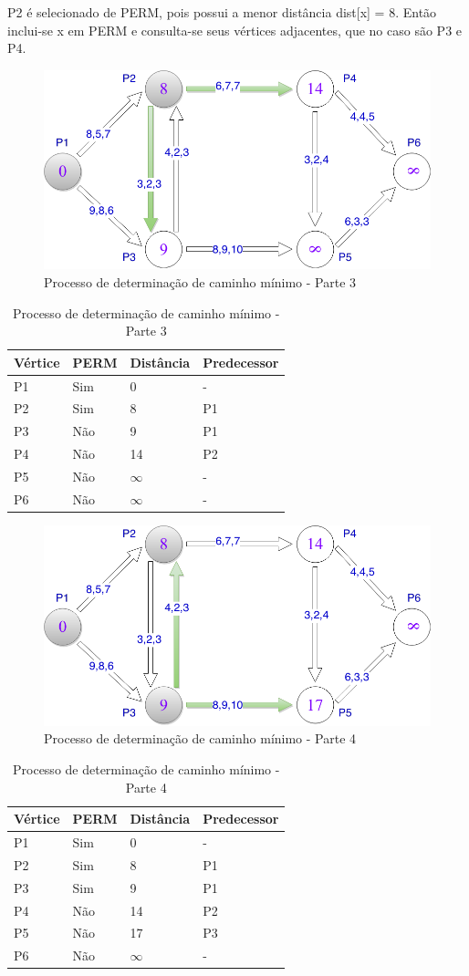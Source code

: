 P2 é selecionado de PERM, pois possui a menor distância dist[x] = 8. Então inclui-se x em PERM e consulta-se
seus vértices adjacentes, que no caso são P3 e P4.
\FloatBarrier
\begin{figure}[htbp]
\centering
 \includegraphics[width=.50\textwidth]{chapters/fig/leo4.png}
\caption{Processo de determinação de caminho mínimo - Parte 3}
\label{fig:leo4}
\end{figure}

\begin{table}[htbp]
	\centering
	\begin{tabular}{l l l l}
	\toprule
	Vértice & PERM & Distância & Predecessor\\
	\midrule
	P1 & Sim & 0 & - \\
	P2 & Sim & 8 & P1 \\
	P3 & Não & 9 & P1 \\
	P4 & Não & 14 & P2 \\
	P5 & Não & $\infty$ & - \\
	P6 & Não & $\infty$ & - \\
	\bottomrule
	\end{tabular}
\caption{Processo de determinação de caminho mínimo - Parte 3}
 \label{tab:leotab3}
\end{table}
\FloatBarrier

\begin{figure}[htbp]
\centering
 \includegraphics[width=.50\textwidth]{chapters/fig/leo5.png}
\caption{Processo de determinação de caminho mínimo - Parte 4}
\label{fig:leo5}
\end{figure}

\begin{table}[htbp]
	\centering
	\begin{tabular}{l l l l}
	\toprule
	Vértice & PERM & Distância & Predecessor\\
	\midrule
	P1 & Sim & 0 & - \\
	P2 & Sim & 8 & P1 \\
	P3 & Sim & 9 & P1 \\
	P4 & Não & 14 & P2 \\
	P5 & Não & 17 & P3 \\
	P6 & Não & $\infty$ & - \\
	\bottomrule
	\end{tabular}
\caption{Processo de determinação de caminho mínimo - Parte 4}
 \label{tab:leotab4}
\end{table}
\FloatBarrier

